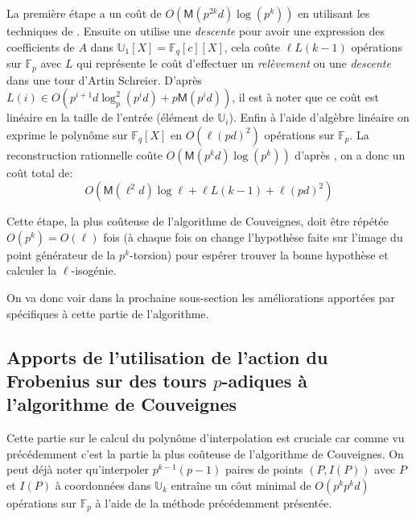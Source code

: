 \documentclass[10pt,a4paper]{book}
\theoremstyle{plain}
\theoremstyle{definition}
\theoremstyle{definition}
\theoremstyle{definition}
\theoremstyle{definition}
\theoremstyle{remark}
\theoremstyle{remark}
\theoremstyle{definition}
\begin{document}
La première étape a un coût de $O(\mathsf{M}(p^{2k}d)\log(p^{k}))$ en utilisant les techniques de \cite[§10.2]{vzGJG03}. Ensuite on utilise une \emph{descente} pour avoir une expression des coefficients de $A$ dans $\mathbb{U}_1[X]=\mathbb{F}_q[c][X]$, cela coûte $\ell L(k-1)$ opérations sur $\mathbb{F}_p$ avec $L$ qui représente le coût d'effectuer un \emph{relèvement} ou une \emph{descente} dans une tour d'Artin Schreier. D'après \cite[Theorem 13]{DeFeo-Shost'12} $L(i) \in O(p^{i+1}d \log^2_p(p^id)+p \mathsf{M}(p^id))$, il est à noter que ce coût est linéaire en la taille de l'entrée (élément de $\mathbb{U}_i$). Enfin à l'aide d'algèbre linéaire on exprime le polynôme sur $\mathbb{F}_q[X]$ en $O(\ell(pd)^2)$ opérations sur $\mathbb{F}_p$. La reconstruction rationnelle coûte $O(\mathsf{M}(p^kd)\log(p^k))$ d'après \cite[§11.1]{vzGJG03}, on a donc un coût total de:
\begin{equation*}
O(\mathsf{M}(\ell^2d)\log \ell + \ell L(k-1) + \ell(pd)^2)
\end{equation*}

Cette étape, la plus coûteuse de l'algorithme de Couveignes, doit être répétée $O(p^k)=O(\ell)$ fois (à chaque fois on change l'hypothèse faite sur l'image du point générateur de la $p^k$-torsion) pour espérer trouver la bonne hypothèse et calculer la $\ell$-isogénie.

On va donc voir dans la prochaine sous-section les améliorations apportées par \cite{DeFeo11} spécifiques à cette partie de l'algorithme.

\subsection{Apports de l'utilisation de l'action du Frobenius sur des tours $p$-adiques à l'algorithme de Couveignes}
\label{sub:fro:int}
Cette partie sur le calcul du polynôme d'interpolation est cruciale car comme vu précédemment c'est la partie la plus coûteuse de l'algorithme de Couveignes. On peut déjà noter qu'interpoler $p^{k-1}(p-1)$ paires de points $(P,I(P))$ avec $P$ et $I(P)$ à coordonnées dans $\mathbb{U}_k$ entraîne un côut minimal de $O(p^k p^kd)$ opérations sur $\mathbb{F}_p$ à l'aide de la méthode précédemment présentée. 
\end{document}
